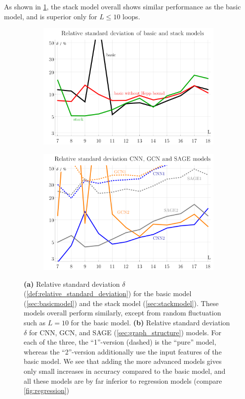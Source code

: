 \documentclass[11pt]{scrartcl}
\numberwithin{equation}{section}
\begin{document}
As shown in \cref{fig:basic_stack_delta}, the stack model overall shows similar performance as the basic model, and is superior only for $L \leq 10$ loops. 


\begin{figure}[htb]
	
	\begin{subfigure}{ .49 \linewidth}
		\centering
		\includegraphics[width=\linewidth]{figures/basic_stack_delta}
		\subcaption{}
		\label{fig:basic_stack_delta}
	\end{subfigure}
	\begin{subfigure}{ .49 \linewidth}
		\centering
		\includegraphics[width=\linewidth]{figures/GCN_CNN_delta}
		\subcaption{}
		\label{fig:GCN_CNN_delta}
	\end{subfigure}
	\caption{ 
		\textbf{(a)}  Relative standard deviation $\delta$ (\cref{def:relative_standard_deviation}) for the basic model (\cref{sec:basicmodel}) and the stack model (\cref{sec:stackmodel}). These models overall perform similarly, except from random fluctuation such as $L=10$ for the basic model.  
		\textbf{(b)} Relative standard deviation $\delta$ for CNN, GCN, and SAGE (\cref{sec:graph_structure}) models. For each of the three, the \enquote{1}-version (dashed) is the \enquote{pure} model, whereas the \enquote{2}-version additionally use the input features of the basic model. We see that adding the more advanced models gives only small increases in accuracy compared to the basic model, and all these models are by far inferior to regression models (compare  \cref{fig:regression}) 
		}
	

\end{figure}
\end{document}
